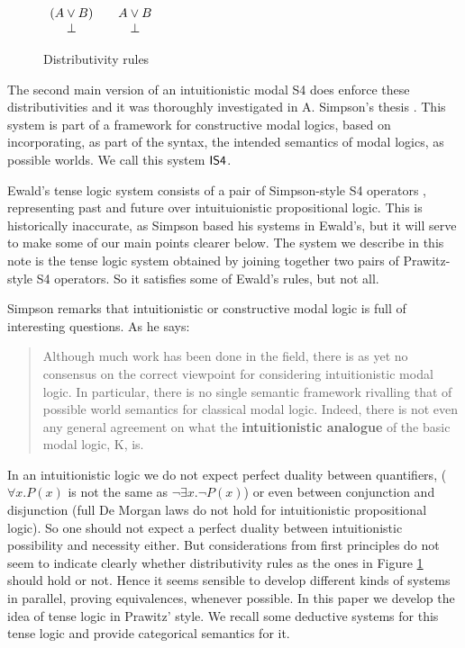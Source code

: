 \documentclass{article}
\let\Diamond\relax
\let\to\relax
\newcommand{\to}{\rightarrow}
\begin{document}
\begin{figure}
  \begin{mdframed}
  \begin{center}
      \begin{math}
        \begin{array}{ccc}
        \Diamond (A \lor B) &\to &\Diamond A \lor \Diamond B\\
        \Diamond \bot &\to &\bot
        \end{array}
       \end{math}
\end{center}
 \end{mdframed}
  \caption{Distributivity rules}
  \label{distrib}
\end{figure}


The second main version of an intuitionistic modal S4 does enforce these distributivities and it was thoroughly investigated in A. Simpson's thesis \cite{simpson1994}. This system is part of a framework for constructive modal logics, based on incorporating, as part of the syntax, the intended semantics of modal logics, as possible worlds. We call this system $\sf IS4$. 

Ewald's tense logic system consists of a pair of Simpson-style S4 operators \cite{simpson1994},
representing past and future over intuituionistic propositional logic. This is historically inaccurate, as Simpson based his systems in Ewald's, but it will serve to make some of our main points clearer below. The system we describe in this note is the tense logic system obtained by joining together two pairs of Prawitz-style S4 operators. So it satisfies some of  Ewald's rules, but not all.

Simpson remarks that intuitionistic or constructive modal logic is full of interesting questions. As he says:
\begin{quote}
Although much work has been done in the field, there is as yet no consensus on the correct viewpoint for considering intuitionistic modal logic.  In particular, there is no single semantic framework rivalling that of possible world semantics for classical modal logic. Indeed, there is not even any general agreement on what the \textbf{intuitionistic analogue} of the basic modal logic, K, is.
\end{quote}
In an intuitionistic logic we do not expect perfect duality between quantifiers, ($\forall x.P(x)$ is not the same as $\neg \exists x.\neg P(x)$) or even between conjunction and disjunction (full De Morgan laws do not hold for intuitionistic propositional logic). So one should not expect a perfect duality between intuitionistic possibility and necessity either. But  considerations from first principles do not seem to  indicate clearly whether distributivity rules as the ones in Figure \ref{distrib} should hold or not. Hence it seems sensible to develop different kinds of systems in parallel, proving equivalences, whenever possible. In this paper we develop the idea of tense logic in  Prawitz' style. We recall some deductive systems for this tense logic and provide categorical semantics for it.
\end{document}
